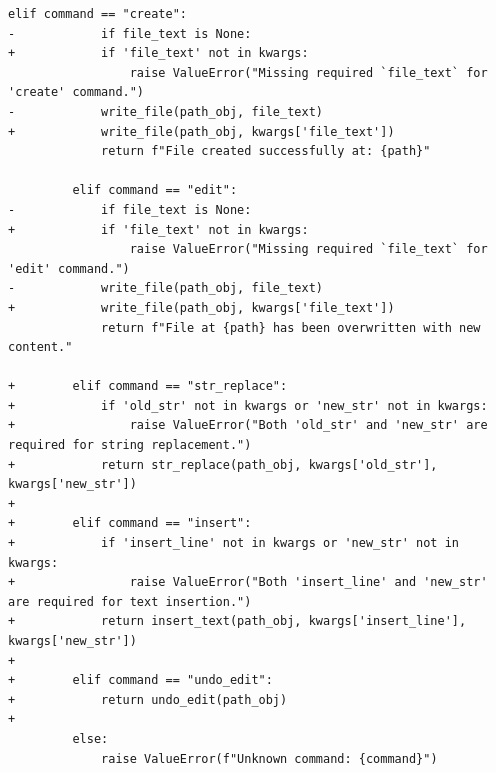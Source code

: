 \documentclass{article} %
\begin{document}
\begin{lstlisting}[style=diffstyle]
         elif command == "create":
-            if file_text is None:
+            if 'file_text' not in kwargs:
                 raise ValueError("Missing required `file_text` for 'create' command.")
-            write_file(path_obj, file_text)
+            write_file(path_obj, kwargs['file_text'])
             return f"File created successfully at: {path}"
 
         elif command == "edit":
-            if file_text is None:
+            if 'file_text' not in kwargs:
                 raise ValueError("Missing required `file_text` for 'edit' command.")
-            write_file(path_obj, file_text)
+            write_file(path_obj, kwargs['file_text'])
             return f"File at {path} has been overwritten with new content."
 
+        elif command == "str_replace":
+            if 'old_str' not in kwargs or 'new_str' not in kwargs:
+                raise ValueError("Both 'old_str' and 'new_str' are required for string replacement.")
+            return str_replace(path_obj, kwargs['old_str'], kwargs['new_str'])
+
+        elif command == "insert":
+            if 'insert_line' not in kwargs or 'new_str' not in kwargs:
+                raise ValueError("Both 'insert_line' and 'new_str' are required for text insertion.")
+            return insert_text(path_obj, kwargs['insert_line'], kwargs['new_str'])
+
+        elif command == "undo_edit":
+            return undo_edit(path_obj)
+
         else:
             raise ValueError(f"Unknown command: {command}")
\end{lstlisting}
\end{document}
